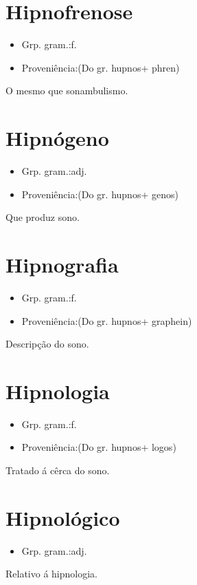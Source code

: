 \documentclass{article}
\begin{document}
\section{Hipnofrenose}
\begin{itemize}
\item {Grp. gram.:f.}
\end{itemize}
\begin{itemize}
\item {Proveniência:(Do gr. \textunderscore hupnos\textunderscore  + \textunderscore phren\textunderscore )}
\end{itemize}
O mesmo que \textunderscore sonambulismo\textunderscore .
\section{Hipnógeno}
\begin{itemize}
\item {Grp. gram.:adj.}
\end{itemize}
\begin{itemize}
\item {Proveniência:(Do gr. \textunderscore hupnos\textunderscore  + \textunderscore genos\textunderscore )}
\end{itemize}
Que produz sono.
\section{Hipnografia}
\begin{itemize}
\item {Grp. gram.:f.}
\end{itemize}
\begin{itemize}
\item {Proveniência:(Do gr. \textunderscore hupnos\textunderscore  + \textunderscore graphein\textunderscore )}
\end{itemize}
Descripção do sono.
\section{Hipnologia}
\begin{itemize}
\item {Grp. gram.:f.}
\end{itemize}
\begin{itemize}
\item {Proveniência:(Do gr. \textunderscore hupnos\textunderscore  + \textunderscore logos\textunderscore )}
\end{itemize}
Tratado á cêrca do sono.
\section{Hipnológico}
\begin{itemize}
\item {Grp. gram.:adj.}
\end{itemize}
Relativo á hipnologia.
\end{document}
